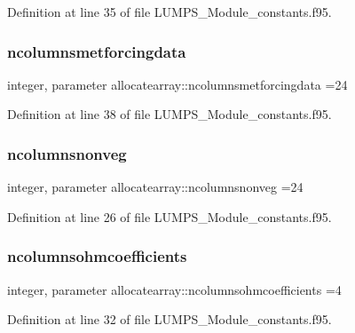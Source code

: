Definition at line 35 of file L\+U\+M\+P\+S\+\_\+\+Module\+\_\+constants.\+f95.

\mbox{\label{namespaceallocatearray_a4e277be816ec99df48ea96cc54eb4f62}} 
\subsubsection{\texorpdfstring{ncolumnsmetforcingdata}{ncolumnsmetforcingdata}}
{\footnotesize\ttfamily integer, parameter allocatearray\+::ncolumnsmetforcingdata =24}



Definition at line 38 of file L\+U\+M\+P\+S\+\_\+\+Module\+\_\+constants.\+f95.

\mbox{\label{namespaceallocatearray_a820ebcf66504982dee392a9c3a224fe2}} 
\subsubsection{\texorpdfstring{ncolumnsnonveg}{ncolumnsnonveg}}
{\footnotesize\ttfamily integer, parameter allocatearray\+::ncolumnsnonveg =24}



Definition at line 26 of file L\+U\+M\+P\+S\+\_\+\+Module\+\_\+constants.\+f95.

\mbox{\label{namespaceallocatearray_a290704d8211d9850cffa53e494c6821e}} 
\subsubsection{\texorpdfstring{ncolumnsohmcoefficients}{ncolumnsohmcoefficients}}
{\footnotesize\ttfamily integer, parameter allocatearray\+::ncolumnsohmcoefficients =4}



Definition at line 32 of file L\+U\+M\+P\+S\+\_\+\+Module\+\_\+constants.\+f95.

